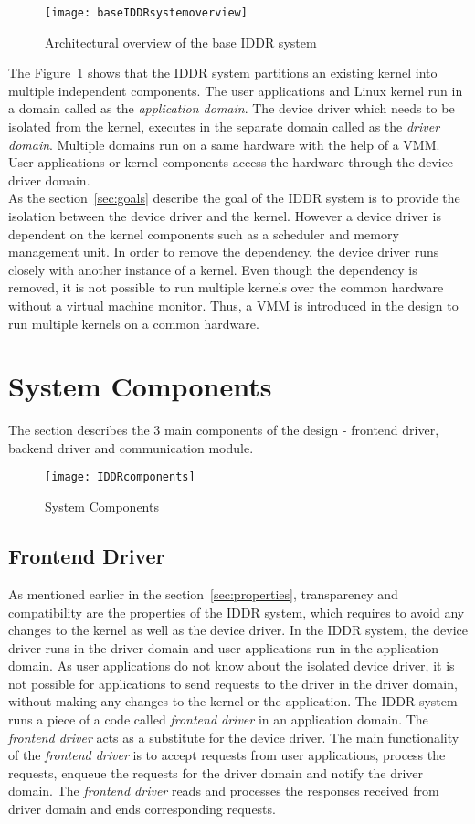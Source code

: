 \begin{figure}[!ht]
\centering
\texttt{[image: baseIDDRsystemoverview]}
\caption{Architectural overview of the base IDDR system}
\label{fig:base IDDR system overview}
\end{figure}
The Figure~\ref{fig:base IDDR system overview} shows that the IDDR system partitions an existing kernel into multiple independent components. The user applications and Linux kernel run in a domain called as the \textit{application domain}. The device driver which needs to be isolated from the kernel, executes in the separate domain called as the \textit{driver domain}. Multiple domains run on a same hardware with the help of a VMM. User applications or kernel components access the hardware through the device driver domain.
\\[3mm]
As the section~\ref{sec:goals} describe the goal of the IDDR system is to provide the isolation between the device driver and the kernel. However a device driver is dependent on the kernel components such as a scheduler and memory management unit. In order to remove the dependency, the device driver runs closely with another instance of a kernel. Even though the dependency is removed, it is not possible to run multiple kernels over the common hardware without a virtual machine monitor. Thus, a VMM is introduced in the design to run multiple kernels on a common hardware. 

\section{System Components}\label{components}
The section describes the 3 main components of the design - frontend driver, backend driver and communication module.
\begin{figure}[!ht]
\centering
\texttt{[image: IDDRcomponents]}
\caption{System Components}
\label{fig:Design Evo1}
\end{figure}

\subsection{Frontend Driver}
\label{subsec:frontend}
As mentioned earlier in the section~\ref{sec:properties}, transparency and compatibility are the properties of the IDDR system, which requires to avoid any changes to the kernel as well as the device driver. In the IDDR system, the device driver runs in the driver domain and user applications run in the application domain. As user applications do not know about the isolated device driver, it is not possible for applications to send requests to the driver in the driver domain, without making any changes to the kernel or the application. The IDDR system runs a piece of a code called \textit{frontend driver} in an application domain. The \textit{frontend driver} acts as a substitute for the device driver. The main functionality of the \textit{frontend driver} is to accept requests from user applications, process the requests, enqueue the requests for the driver domain and notify the driver domain. The \textit{frontend driver} reads and processes the responses received from driver domain and ends corresponding requests.

